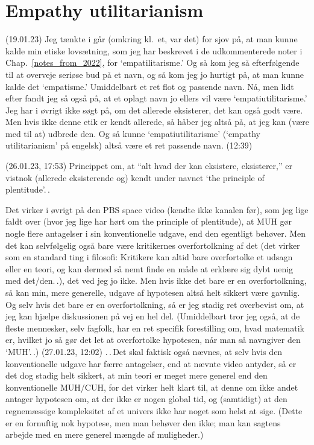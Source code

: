 \documentclass{report}
\begin{document}
\section{Empathy utilitarianism}

(19.01.23) Jeg tænkte i går (omkring kl.\ et, var det) for sjov på, at man kunne kalde min etiske lovsætning, som jeg har beskrevet i de udkommenterede noter i Chap.\ \ref{notes_from_2022}, for `empatilitarisme.' Og så kom jeg så efterfølgende til at overveje seriøse bud på et navn, og så kom jeg jo hurtigt på, at man kunne kalde det `empatisme.' Umiddelbart et ret flot og passende navn. Nå, men lidt efter fandt jeg så også på, at et oplagt navn jo ellers vil være `empatiutilitarisme.' Jeg har i øvrigt ikke søgt på, om det allerede eksisterer, det kan også godt være. Men hvis ikke denne etik er kendt allerede, så håber jeg altså på, at jeg kan (være med til at) udbrede den. Og så kunne `empatiutilitarisme' (`empathy utilitarianism' på engelsk) altså være et ret passende navn. (12:39)



(26.01.23, 17:53) Princippet om, at ``alt hvad der kan eksistere, eksisterer,'' er vistnok (allerede eksisterende og) kendt under navnet `the principle of plentitude'.\,.

Det virker i øvrigt på den PBS space video (kendte ikke kanalen før), som jeg lige faldt over (hvor jeg lige har hørt om the principle of plentitude), at MUH gør nogle flere antagelser i sin konventionelle udgave, end den egentligt behøver. Men det kan selvfølgelig også bare være kritikernes overfortolkning af det (det virker som en standard ting i filosofi: Kritikere kan altid bare overfortolke et udsagn eller en teori, og kan dermed så nemt finde en måde at erklære sig dybt uenig med det/den.\,.), det ved jeg jo ikke. Men hvis ikke det bare er en overfortolkning, så kan min, mere generelle, udgave af hypotesen altså helt sikkert være gavnlig. Og selv hvis det bare er en overfortolkning, så er jeg stadig ret overbevist om, at jeg kan hjælpe diskussionen på vej en hel del. (Umiddelbart tror jeg også, at de fleste mennesker, selv fagfolk, har en ret specifik forestilling om, hvad matematik er, hvilket jo så gør det let at overfortolke hypotesen, når man så navngiver den `MUH'.\,.) (27.01.23, 12:02) .\,.\,Det skal faktisk også nævnes, at selv hvis den konventionelle udgave har færre antagelser, end at nævnte video antyder, så er det dog stadig helt sikkert, at min teori er meget mere generel end den konventionelle MUH/CUH, for det virker helt klart til, at denne om ikke andet antager hypotesen om, at der ikke er nogen global tid, og (samtidigt) at den regnemæssige kompleksitet af et univers ikke har noget som helst at sige. (Dette er en fornuftig nok hypotese, men man behøver den ikke; man kan sagtens arbejde med en mere generel mængde af muligheder.)
\end{document}
